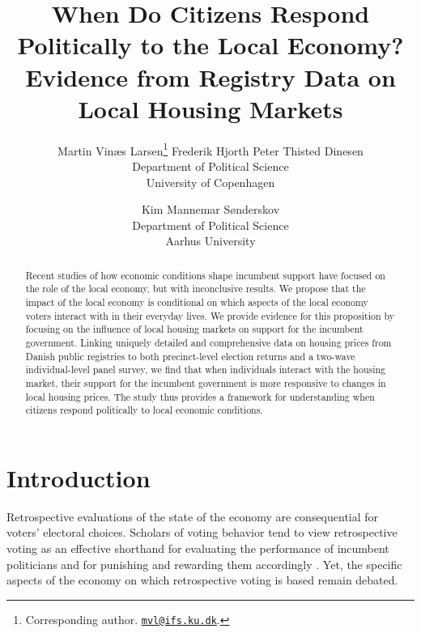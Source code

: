 \documentclass[12pt,a4paper]{article}
\title{\textbf{When Do Citizens Respond Politically to the Local Economy? \\ \large{Evidence from Registry Data on Local Housing Markets}}}
\author{Martin Vinæs Larsen\thanks{Corresponding author. \href{mailto:mvl@ifs.ku.dk}{\texttt{mvl@ifs.ku.dk}}. } \qquad Frederik Hjorth \qquad Peter Thisted  Dinesen \\Department of Political Science \\ University of Copenhagen \and Kim Mannemar  Sønderskov  \\Department of Political Science \\ Aarhus University   }
\begin{document}
	
	\maketitle
	
	\begin{abstract} \noindent Recent studies of how economic conditions shape incumbent support have focused on the role of the local economy, but with inconclusive results. We propose that the impact of the local economy is conditional on which aspects of the local economy voters interact with in their everyday lives. We provide evidence for this proposition by focusing on the influence of local housing markets on support for the incumbent government. Linking uniquely detailed and comprehensive data on housing prices from Danish public registries to both precinct-level election returns and a two-wave individual-level panel survey, we find that when individuals interact with the housing market, their support for the incumbent government is more responsive to changes in local housing prices. The study thus provides a framework for understanding when citizens respond politically to local economic conditions.
		
	\end{abstract}
	
	
	
	\newpage
	
	\onehalfspacing
	
	\section{Introduction}
	
	\noindent Retrospective evaluations of the state of the economy are consequential for voters' electoral choices. Scholars of voting behavior tend to view retrospective voting as an effective shorthand for evaluating the performance of incumbent politicians and for punishing and rewarding them accordingly \citep{ashworth2012electoral,healy2013retrospective}. Yet, the specific aspects of the economy on which retrospective voting is based remain debated. 
	
\end{document}
